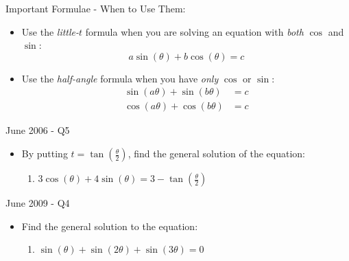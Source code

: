 \documentclass[10pt]{beamer}
\begin{document}
\begin{frame}{Important Formulae - When to Use Them:}
	\begin{itemize}
		\item Use the \textit{little-$t$} formula when you are solving an equation with \textit{both} $\cos$ and $\sin$:
			\begin{equation*}
				a\sin(\theta) + b\cos(\theta) = c
			\end{equation*}
		\item <2-> Use the \textit{half-angle} formula when you have \textit{only} $\cos$ or $\sin$:
			\begin{align*}
			\sin(a\theta) + \sin(b\theta) &= c \\
			\cos(a\theta) + \cos(b\theta) &= c
			\end{align*}
	\end{itemize}
\end{frame}

\begin{frame}{June 2006 - Q5}
	\begin{itemize}
		\item By putting $t = \tan\left(\frac{\theta}{2}\right)$, find the general solution of the equation:
		\begin{enumerate}
			\item $3\cos(\theta) + 4\sin(\theta) = 3 - \tan\left(\frac{\theta}{2}\right)$
		\end{enumerate}
	\end{itemize}
\end{frame}

\begin{frame}{June 2009 - Q4}
	\begin{itemize}
		\item Find the general solution to the equation:
		\begin{enumerate}
			\item $\sin(\theta) + \sin(2\theta) + \sin(3\theta) = 0$
		\end{enumerate}
	\end{itemize}
\end{frame}
\end{document}

